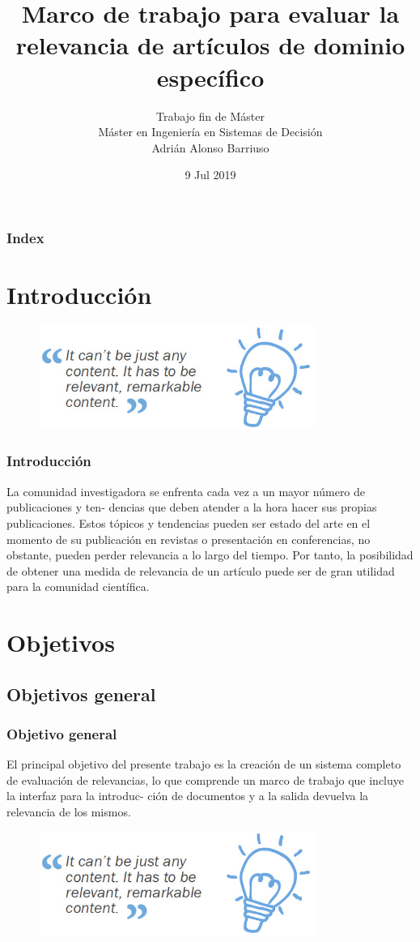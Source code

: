 \documentclass[10pt,fleqn]{beamer}
\institute[]{}
\author[Adrián Alonso Barriuso]{Trabajo fin de Máster\\
\vspace{0.5cm}Máster en Ingeniería en Sistemas de Decisión \\ \vspace{1cm}
\scriptsize{Adrián Alonso Barriuso}}
\title[URJC]{Marco de trabajo para evaluar la relevancia de artículos de dominio específico}
\date[Jul 2019]{9 Jul 2019}
\begin{document}
\begin{frame}
  \titlepage
\end{frame}

\begin{frame}
\frametitle{Index}
\tableofcontents
\end{frame}

\section{Introducción}
\begin{frame}
\begin{figure}
  \centering
  \includegraphics[width=9cm, keepaspectratio]{relevant-content.jpg}
\end{figure}
  \frametitle{Introducción}
La comunidad investigadora se enfrenta cada vez a un mayor número de publicaciones y ten-
dencias que deben atender a la hora hacer sus propias publicaciones. Estos tópicos y tendencias pueden ser estado del arte en el momento de su publicación en revistas o presentación en conferencias, no obstante, pueden perder relevancia a lo largo del tiempo. Por tanto, la posibilidad de obtener una medida de relevancia de un artículo puede ser de gran utilidad para la comunidad científica.
\end{frame}

\section{Objetivos}
\subsection{Objetivos general}
\begin{frame}\frametitle{Objetivo general} 
El principal objetivo del presente trabajo es la creación de un sistema completo de evaluación
de relevancias, lo que comprende un marco de trabajo que incluye la interfaz para la introduc-
ción de documentos y a la salida devuelva la relevancia de los mismos.

\begin{figure}
  \centering
  \includegraphics[width=9cm, keepaspectratio]{relevant-content.jpg}
\end{figure}
\end{frame}
\end{document}
